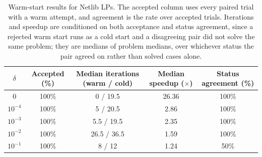 \begin{table}[htbp]
\centering
\small
\caption{Warm-start results for Netlib LPs. The accepted column uses every paired trial with a warm attempt, and agreement is the rate over accepted trials. Iterations and speedup are conditioned on both acceptance and status agreement, since a rejected warm start runs as a cold start and a disagreeing pair did not solve the same problem; they are medians of problem medians, over whichever status the pair agreed on rather than solved cases alone.}
\label{tab:warm-lp}
\begin{tabular}{ccccc}
\hline
$\delta$ & Accepted (\%) & Median iterations (warm / cold) & Median speedup ($\times$) & Status agreement (\%) \\
\hline
$0$ & 100\% & 0 / 19.5 & 26.36 & 100\% \\
$10^{-4}$ & 100\% & 5 / 20.5 & 2.86 & 100\% \\
$10^{-3}$ & 100\% & 5.5 / 19.5 & 2.35 & 100\% \\
$10^{-2}$ & 100\% & 26.5 / 36.5 & 1.59 & 100\% \\
$10^{-1}$ & 100\% & 8 / 12 & 1.24 & 50\% \\
\hline
\end{tabular}
\end{table}
